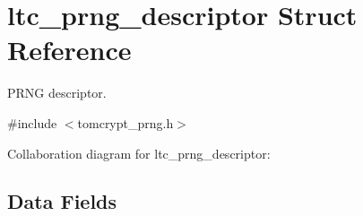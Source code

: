 \hypertarget{structltc__prng__descriptor}{}\section{ltc\+\_\+prng\+\_\+descriptor Struct Reference}
\label{structltc__prng__descriptor}


P\+R\+NG descriptor.  




{\ttfamily \#include $<$tomcrypt\+\_\+prng.\+h$>$}



Collaboration diagram for ltc\+\_\+prng\+\_\+descriptor\+:
\subsection*{Data Fields}
